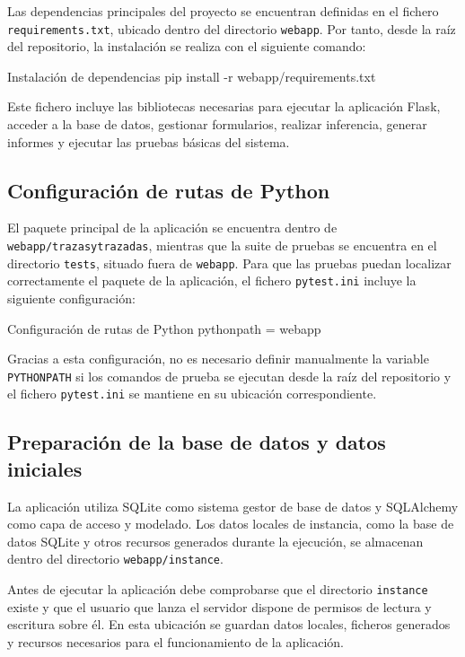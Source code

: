 Las dependencias principales del proyecto se encuentran definidas en el fichero \texttt{requirements.txt}, ubicado dentro del directorio \texttt{webapp}. Por tanto, desde la raíz del repositorio, la instalación se realiza con el siguiente comando:

\begin{pythonbox}{Instalación de dependencias}
pip install -r webapp/requirements.txt
\end{pythonbox}

Este fichero incluye las bibliotecas necesarias para ejecutar la aplicación Flask, acceder a la base de datos, gestionar formularios, realizar inferencia, generar informes y ejecutar las pruebas básicas del sistema.

\subsection{Configuración de rutas de Python}

El paquete principal de la aplicación se encuentra dentro de \\ \texttt{webapp/trazasytrazadas}, mientras que la suite de pruebas se encuentra en el directorio \texttt{tests}, situado fuera de \texttt{webapp}. Para que las pruebas puedan localizar correctamente el paquete de la aplicación, el fichero \texttt{pytest.ini} incluye la siguiente configuración:

\begin{infocmdbox}{Configuración de rutas de Python}
pythonpath = webapp
\end{infocmdbox}

Gracias a esta configuración, no es necesario definir manualmente la variable \texttt{PYTHONPATH} si los comandos de prueba se ejecutan desde la raíz del repositorio y el fichero \texttt{pytest.ini} se mantiene en su ubicación correspondiente.

\subsection{Preparación de la base de datos y datos iniciales}

La aplicación utiliza SQLite como sistema gestor de base de datos y SQLAlchemy como capa de acceso y modelado. Los datos locales de instancia, como la base de datos SQLite y otros recursos generados durante la ejecución, se almacenan dentro del directorio \texttt{webapp/instance}.

Antes de ejecutar la aplicación debe comprobarse que el directorio \texttt{instance} existe y que el usuario que lanza el servidor dispone de permisos de lectura y escritura sobre él. En esta ubicación se guardan datos locales, ficheros generados y recursos necesarios para el funcionamiento de la aplicación.

